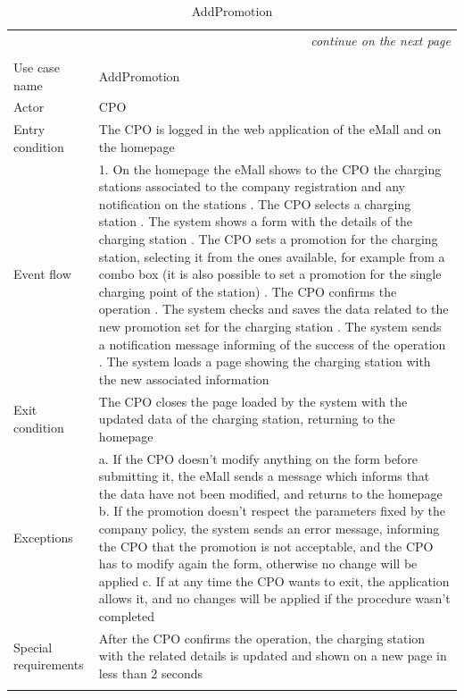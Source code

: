 \begin{center}
    \begin{longtable}{p{4cm} p{11cm}}
    \multicolumn{2}{r}{\itshape{continue on the next page}}\\
    \endfoot 
    \\
    \endlastfoot
    \hline
     Use case name &  AddPromotion\\
     \hline
     Actor & CPO \\
     \hline
     Entry condition & The CPO is logged in the web application of the eMall and on the homepage \\
     \hline
     Event flow &   1. On the homepage the eMall shows to the CPO the charging stations associated                 to the company registration and any notification on the stations \newline
                    2. The CPO selects a charging station \newline 
                    3. The system shows a form with the details of the charging station \newline
                    4. The CPO sets a promotion for the charging station, selecting it from the ones available, for example from a combo box (it is also possible to set a promotion for the single charging point of the station) \newline
                    5. The CPO confirms the operation \newline
                    6. The system checks and saves the data related to the new promotion set for the charging station \newline
                    7. The system sends a notification message informing of the success of the operation \newline
                    8. The system loads a page showing the charging station with the new associated information\\
     \hline
     Exit condition &  The CPO closes the page loaded by the system with the updated data of the charging station, returning to the homepage \\
     \hline
     Exceptions &   
        a. If the CPO doesn't modify anything on the form before submitting it, the eMall sends a message which informs that the data have not been modified, and returns to the homepage \newline
        b. If the promotion doesn't respect the parameters fixed by the company policy, the system sends an error message, informing the CPO that the promotion is not acceptable, and the CPO has to modify again the form, otherwise no change will be applied \newline
        c. If at any time the CPO wants to exit, the application allows it, and no changes will be applied if the procedure wasn't completed \\
     \hline
     Special requirements & After the CPO confirms the operation, the charging station with the related details is updated and shown on a new page in less than 2 seconds\\
     \hline
    \caption{AddPromotion}
    \label{tab:AddPromotion}
    \end{longtable}
\end{center}

